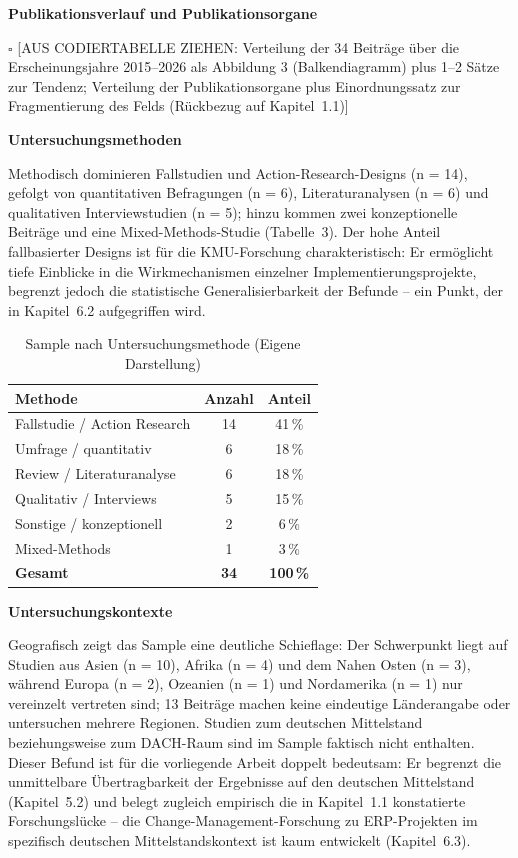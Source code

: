 \textbf{Publikationsverlauf und Publikationsorgane}

$\square$ [AUS CODIERTABELLE ZIEHEN: Verteilung der 34 Beitr\"age \"uber die Erscheinungsjahre 2015--2026 als Abbildung 3 (Balkendiagramm) plus 1--2 S\"atze zur Tendenz; Verteilung der Publikationsorgane plus Einordnungssatz zur Fragmentierung des Felds (R\"uckbezug auf Kapitel~1.1)]

\textbf{Untersuchungsmethoden}

Methodisch dominieren Fallstudien und Action-Research-Designs (n = 14), gefolgt von quantitativen Befragungen (n = 6), Literaturanalysen (n = 6) und qualitativen Interviewstudien (n = 5); hinzu kommen zwei konzeptionelle Beitr\"age und eine Mixed-Methods-Studie (Tabelle~3). Der hohe Anteil fallbasierter Designs ist f\"ur die KMU-Forschung charakteristisch: Er erm\"oglicht tiefe Einblicke in die Wirkmechanismen einzelner Implementierungsprojekte, begrenzt jedoch die statistische Generalisierbarkeit der Befunde -- ein Punkt, der in Kapitel~6.2 aufgegriffen wird.

\begin{table}[H]
\centering
\begin{tabularx}{0.6\textwidth}{lcc}
\toprule
\textbf{Methode} & \textbf{Anzahl} & \textbf{Anteil} \\
\midrule
Fallstudie / Action Research & 14 & 41\,\% \\
Umfrage / quantitativ & 6 & 18\,\% \\
Review / Literaturanalyse & 6 & 18\,\% \\
Qualitativ / Interviews & 5 & 15\,\% \\
Sonstige / konzeptionell & 2 & 6\,\% \\
Mixed-Methods & 1 & 3\,\% \\
\textbf{Gesamt} & \textbf{34} & \textbf{100\,\%} \\
\bottomrule
\end{tabularx}
\caption{Sample nach Untersuchungsmethode (Eigene Darstellung)}
\label{tab:untersuchungsmethoden}
\end{table}

\textbf{Untersuchungskontexte}

Geografisch zeigt das Sample eine deutliche Schieflage: Der Schwerpunkt liegt auf Studien aus Asien (n = 10), Afrika (n = 4) und dem Nahen Osten (n = 3), w\"ahrend Europa (n = 2), Ozeanien (n = 1) und Nordamerika (n = 1) nur vereinzelt vertreten sind; 13 Beitr\"age machen keine eindeutige L\"anderangabe oder untersuchen mehrere Regionen. Studien zum deutschen Mittelstand beziehungsweise zum DACH-Raum sind im Sample faktisch nicht enthalten. Dieser Befund ist f\"ur die vorliegende Arbeit doppelt bedeutsam: Er begrenzt die unmittelbare \"Ubertragbarkeit der Ergebnisse auf den deutschen Mittelstand (Kapitel~5.2) und belegt zugleich empirisch die in Kapitel~1.1 konstatierte Forschungsl\"ucke -- die Change-Management-Forschung zu ERP-Projekten im spezifisch deutschen Mittelstandskontext ist kaum entwickelt (Kapitel~6.3).

